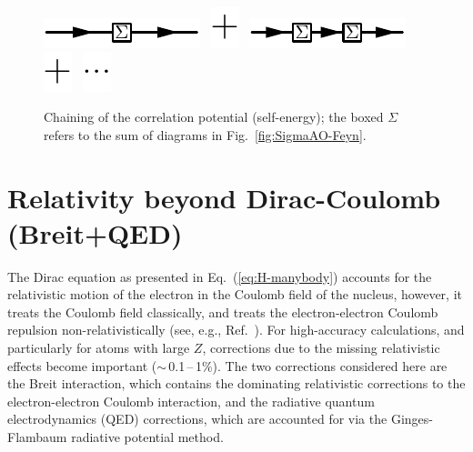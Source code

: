 \documentclass[10pt,twocolumn,a4paper]{article}%
\begin{document}
\begin{figure}%
\centering
\includegraphics[height=0.033\textwidth]{img/Sigma/Chaining1}~
\includegraphics[height=0.033\textwidth]{img/Sigma/plus}~
\includegraphics[height=0.033\textwidth]{img/Sigma/Chaining2}~
\includegraphics[height=0.033\textwidth]{img/Sigma/plus}~
\includegraphics[height=0.033\textwidth]{img/Sigma/dotdotdot}
\caption{\label{fig:Chaining}\small Chaining of the correlation potential (self-energy); the boxed $\Sigma$ refers to the sum of diagrams in Fig.~\ref{fig:SigmaAO-Feyn}.}
\end{figure}













\section{Relativity beyond Dirac-Coulomb (Breit+QED)}


The Dirac equation as presented in Eq.~(\ref{eq:H-manybody})
accounts for the relativistic motion of the electron in the Coulomb field of the nucleus, however, it treats the Coulomb field classically, and treats the electron-electron Coulomb repulsion non-relativistically (see, e.g., Ref.~\cite{BetheBook}).
For high-accuracy calculations, and particularly for atoms with large $Z$, corrections due to the missing relativistic effects become important ($\sim$\,0.1\,--\,1\%).
The two corrections considered here are the
Breit interaction, which contains the dominating relativistic corrections to the electron-electron Coulomb interaction, and
the radiative quantum electrodynamics (QED) corrections, which are accounted for via the Ginges-Flambaum radiative potential method.
\end{document}

